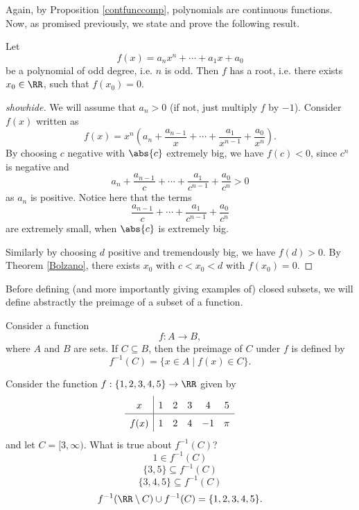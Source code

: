 \documentclass{article}
\begin{document}
Again, by Proposition \ref{contfunccomp}, polynomials are continuous functions.
Now, as promised previously, we state and prove the following result.

\begin{proposition}[emph]
Let
$$
f(x) = a_n x^n + \cdots + a_1 x + a_0
$$
be a polynomial of odd degree, i.e. $n$ is odd. Then $f$ has a root,
i.e. there exists $x_0\in\RR$, such that $f(x_0) = 0$.
\end{proposition}
\begin{proof}[showhide]
We will assume that $a_n > 0$ (if not, just multiply $f$ by $-1$). Consider $f(x)$ written as
$$
f(x) = x^n \left(a_n + \frac{a_{n-1}}{x} + \cdots + \frac{a_1}{x^{n-1}} + \frac{a_0}{x^n}\right).
$$
By choosing $c$ negative with $\abs{c}$ extremely big, we have $f(c) < 0$, 
since $c^n$ is negative and 
$$
a_n + \frac{a_{n-1}}{c} + \cdots + \frac{a_1}{c^{n-1}} + \frac{a_0}{c^n} > 0
$$
as $a_n$ is positive. Notice here that the terms
$$
\frac{a_{n-1}}{c} + \cdots + \frac{a_1}{c^{n-1}} + \frac{a_0}{c^n} 
$$
are extremely small, when $\abs{c}$ is extremely big.

Similarly by choosing
$d$ positive and tremendously big, we have $f(d) > 0$.
By Theorem \ref{Bolzano}, there exists $x_0$ with $c < x_0 < d$ with
$f(x_0) = 0$.
\end{proof}


Before defining (and more importantly giving examples of) closed subsets, we will
define abstractly the preimage of a subset of a function.

\begin{definition}[emph]
Consider a
function
$$
f: A \rightarrow B,
$$
where $A$ and $B$ are sets. If $C\subseteq B$, then the
preimage of $C$ under $f$ is defined by
\begin{equation*}
f^{-1}(C) = \{x\in A \mid f(x)\in C\}.
\end{equation*}
\end{definition}

\begin{quizexercise}[showhide]
  \begin{quiz}
    \question
    Consider the function $f:\{1, 2, 3, 4, 5\}\rightarrow \RR$ given by
    $$
\def\arraystretch{1.5}
\begin{array}{c|ccccccc}
x & 1 & 2 & 3 & 4 & 5\\ \hline
f(x) & 1 & 2 & 4 & -1 & \pi
\end{array}
$$
and let $C = [3, \infty)$. What is true about $f^{-1}(C)$?
$$
1\in f^{-1}(C)
$$
$$
\{3, 5\}\subseteq f^{-1}(C)
$$
$$
\{3, 4, 5\}\subseteq f^{-1}(C)
$$
$$
f^{-1}(\RR\setminus C) \cup f^{-1}(C) = \{1, 2, 3, 4, 5\}.
$$
\end{quiz}
\end{quizexercise}
\end{document}
